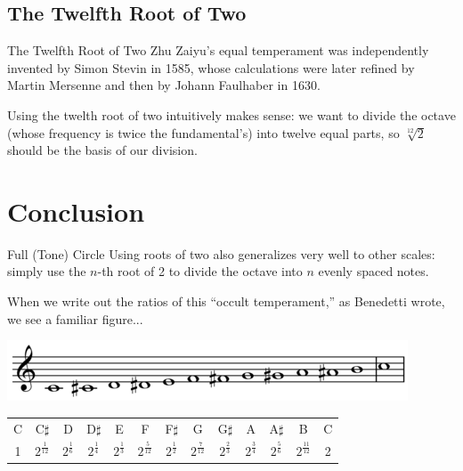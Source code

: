 \documentclass{beamer}
\begin{document}
\subsection{The Twelfth Root of Two}
\begin{frame}{The Twelfth Root of Two}
    \pause Zhu Zaiyu's equal temperament was independently invented by Simon Stevin in 1585, whose calculations were later refined by Martin Mersenne and then by Johann Faulhaber in 1630.
    
    \pause Using the twelth root of two intuitively makes sense: we want to divide the octave (whose frequency is twice the fundamental's) into twelve equal parts, so $\sqrt[12]{2}$ should be the basis of our division.
\end{frame}

\section{Conclusion}
\begin{frame}{Full (Tone) Circle}
    \pause Using roots of two also generalizes very well to other scales: simply use the $n$-th root of 2 to divide the octave into $n$ evenly spaced notes.
    
    \pause When we write out the ratios of this ``occult temperament,'' as Benedetti wrote, we see a familiar figure...
    
    \pause \includegraphics[width=\textwidth]{12-tone-scale.png}
    \begin{table}
        \centering
        \begin{tabular}{cccccccccccc|c}\small
            C & C$\sharp$ & D & D$\sharp$ & E & F & F$\sharp$ & G & G$\sharp$ & A & A$\sharp$ & B & C \\
            1 & $2^{\frac{1}{12}}$ & $2^{\frac{1}{6}}$ & $2^{\frac{1}{4}}$ & $2^{\frac{1}{3}}$ & $2^{\frac{5}{12}}$ & $2^{\frac{1}{2}}$ & $2^{\frac{7}{12}}$ & $2^{\frac{2}{3}}$ & $2^{\frac{3}{4}}$ & $2^{\frac{5}{6}}$ & $2^{\frac{11}{12}}$ & 2
        \end{tabular}
    \end{table}
\end{frame}
\end{document}
